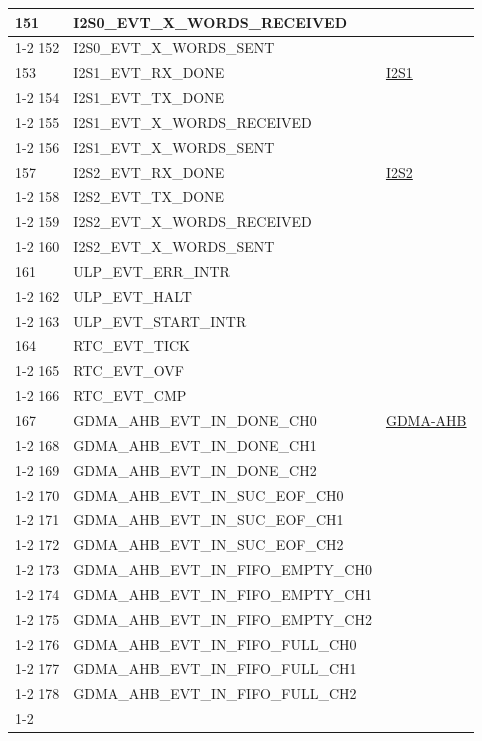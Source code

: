 \documentclass[main\_\_CN.tex]{subfiles}
\begin{document}
\begin{longtable}{ | l | l | l | }
151 & I2S0\_EVT\_X\_WORDS\_RECEIVED     & \\ \cline{1-2}
152 & I2S0\_EVT\_X\_WORDS\_SENT  & \\ \hline
153 & I2S1\_EVT\_RX\_DONE & \hyperref[mod:i2s]{I2S1}   \\ \cline{1-2}
154 & I2S1\_EVT\_TX\_DONE & \\ \cline{1-2}
155 & I2S1\_EVT\_X\_WORDS\_RECEIVED     & \\ \cline{1-2}
156 & I2S1\_EVT\_X\_WORDS\_SENT  & \\ \hline
157 & I2S2\_EVT\_RX\_DONE &  \hyperref[mod:i2s]{I2S2}   \\ \cline{1-2}
158 & I2S2\_EVT\_TX\_DONE & \\ \cline{1-2}
159 & I2S2\_EVT\_X\_WORDS\_RECEIVED     & \\ \cline{1-2}
160 & I2S2\_EVT\_X\_WORDS\_SENT  & \\ \hline
161 & ULP\_EVT\_ERR\_INTR  & \nameref{mod:ulp}   \\ \cline{1-2}
162 & ULP\_EVT\_HALT & \\ \cline{1-2}
163 & ULP\_EVT\_START\_INTR& \\ \hline
164 & RTC\_EVT\_TICK     & \nameref{mod:rtctimer}   \\ \cline{1-2}
165 & RTC\_EVT\_OVF      & \\ \cline{1-2}
166 & RTC\_EVT\_CMP      & \\ \hline
167 & GDMA\_AHB\_EVT\_IN\_DONE\_CH0  &  \hyperref[mod:dma]{GDMA-AHB} \\ \cline{1-2}
168 & GDMA\_AHB\_EVT\_IN\_DONE\_CH1  & \\ \cline{1-2}
169 & GDMA\_AHB\_EVT\_IN\_DONE\_CH2  & \\ \cline{1-2}
170 & GDMA\_AHB\_EVT\_IN\_SUC\_EOF\_CH0     & \\ \cline{1-2}
171 & GDMA\_AHB\_EVT\_IN\_SUC\_EOF\_CH1     & \\ \cline{1-2}
172 & GDMA\_AHB\_EVT\_IN\_SUC\_EOF\_CH2     & \\ \cline{1-2}
173 & GDMA\_AHB\_EVT\_IN\_FIFO\_EMPTY\_CH0  & \\ \cline{1-2}
174 & GDMA\_AHB\_EVT\_IN\_FIFO\_EMPTY\_CH1  & \\ \cline{1-2}
175 & GDMA\_AHB\_EVT\_IN\_FIFO\_EMPTY\_CH2  & \\ \cline{1-2}
176 & GDMA\_AHB\_EVT\_IN\_FIFO\_FULL\_CH0   & \\ \cline{1-2}
177 & GDMA\_AHB\_EVT\_IN\_FIFO\_FULL\_CH1   & \\ \cline{1-2}
178 & GDMA\_AHB\_EVT\_IN\_FIFO\_FULL\_CH2   & \\ \cline{1-2}

\end{longtable}
\end{document}
